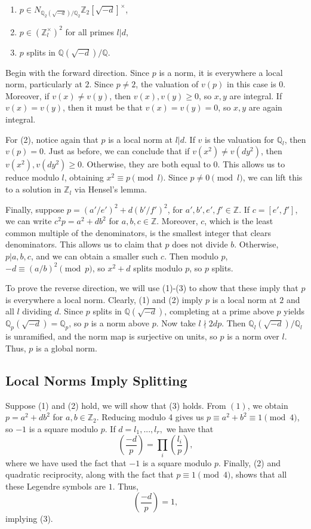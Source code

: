 \documentclass[12pt]{amsart}
\theoremstyle{named}
\newcommand{\Z}{\mathbb{Z}}
\newcommand{\Q}{\mathbb{Q}}
\begin{document}
\begin{enumerate}
  \item $p \in N_{\Q_2(\sqrt{-d})/\Q_2}\Z_2[\sqrt{-d}]^\times$,
  \item $p \in (\Z_l^\times)^2$ for all primes $l | d$,
  \item $p$ splits in $\Q(\sqrt{-d})/\Q$.
\end{enumerate}

Begin with the forward direction. Since $p$ is a norm, it is everywhere a local
norm, particularly at $2$. Since $p \neq 2$, the valuation of $v(p)$ in this
case is $0$. Moreover, if $v(x) \neq v(y)$, then $v(x), v(y) \geq 0$, so
$x, y$ are integral. If $v(x) = v(y)$, then it must be that
$v(x) = v(y) = 0$, so $x,y$ are again integral.

For (2), notice again that $p$ is a local norm at $l|d$. If $v$ is the
valuation for $\Q_l$, then $v(p) = 0$. Just as before, we can conclude that if
$v(x^2) \neq v(dy^2)$, then $v(x^2), v(dy^2) \geq 0$. Otherwise, they are both
equal to 0. This allows us to reduce modulo $l$, obtaining
$x^2 \equiv p \pmod l$. Since $p \neq 0 \pmod l$, we can lift this to a solution
in $\Z_l$ via Hensel's lemma.

Finally, suppose $p = (a'/e')^2 + d(b'/f')^2$, for $a', b', e', f' \in \Z$. If
$c = [e', f']$, we can write $c^2 p = a^2 + d b^2$ for $a, b, c \in \Z$.
Moreover, $c$, which is the least common multiple of the denominators,
is the smallest integer that clears  denominators. This allows us to claim that 
$p$ does not divide $b$.  Otherwise, $p | a, b, c$, and we can obtain a smaller 
such $c$. Then modulo $p$, $-d \equiv (a/b)^2 \pmod p$, so $x^2 + d$ splits
modulo $p$, so $p$ splits.

To prove the reverse direction, we will use (1)-(3) to show that these imply
that $p$ is everywhere a local norm. Clearly, (1) and (2) imply $p$ is a local
norm at $2$ and all $l$ dividing $d$. Since $p$ splits in $\Q(\sqrt{-d})$,
completing at a prime above $p$ yields $\Q_p(\sqrt{-d}) = \Q_p$, so $p$ is a
norm above $p$. Now take $l \nmid 2dp$. Then $\Q_l(\sqrt{-d})/\Q_l$ is
unramified, and the norm map is surjective on units, so $p$ is a norm over $l$.
Thus, $p$ is a global norm.

\subsection{Local Norms Imply Splitting} Suppose (1) and (2) hold, we will show
that (3) holds. From $(1)$, we obtain $p = a^2 + db^2$ for $a, b \in \Z_2$.
Reducing modulo 4 gives us $p \equiv a^2 + b^2 \equiv 1 \pmod 4$, so $-1$
is a square modulo $p$. If $d = l_1, ..., l_r,$ we have that
\[ \left(\dfrac{-d}{p}\right) = \prod_i \left(\dfrac{l_i}{p}\right), \]
where we have used the fact that $-1$ is a square modulo $p$. Finally, (2)
and quadratic reciprocity, along with the fact that $p \equiv 1 \pmod 4$,
shows that all these Legendre symbols are $1$. Thus,
\[ \left(\dfrac{-d}{p}\right) = 1, \] implying (3).
\end{document}

